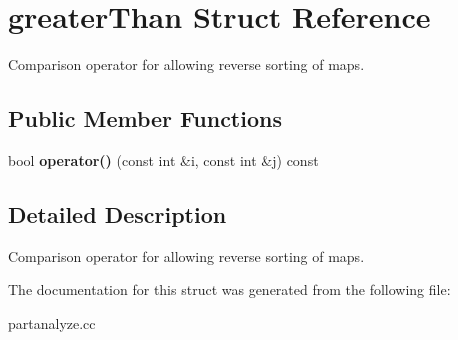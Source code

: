 \section{greater\-Than Struct Reference}
\label{structgreaterThan}
Comparison operator for allowing reverse sorting of maps.  


\subsection*{Public Member Functions}
\begin{CompactItemize}
\item 
bool {\bf operator()} (const int \&i, const int \&j) const\label{structgreaterThan_a0}

\end{CompactItemize}


\subsection{Detailed Description}
Comparison operator for allowing reverse sorting of maps. 



The documentation for this struct was generated from the following file:\begin{CompactItemize}
\item 
partanalyze.cc\end{CompactItemize}

